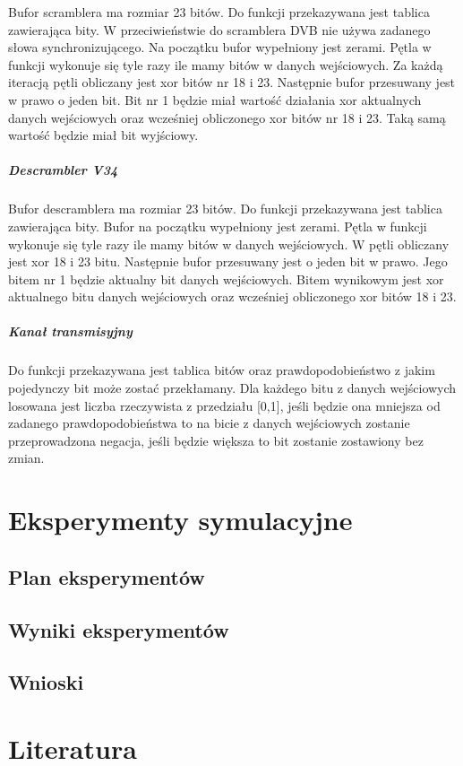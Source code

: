 \documentclass[polish, 11pt]{article}
\begin{document}
    	Bufor scramblera ma rozmiar 23 bitów. Do funkcji przekazywana jest tablica zawierająca bity. W przeciwieństwie do scramblera DVB nie używa zadanego słowa synchronizującego. Na początku bufor wypełniony jest zerami. Pętla w funkcji wykonuje się tyle razy ile mamy bitów w danych wejściowych.  Za każdą iteracją pętli obliczany jest xor bitów nr 18 i 23. Następnie bufor przesuwany jest w prawo o jeden bit. Bit nr 1 będzie miał wartość działania xor aktualnych danych wejściowych oraz wcześniej obliczonego xor bitów nr 18 i 23. Taką samą wartość będzie miał bit wyjściowy.
    	\subparagraph{Descrambler V34\\}
    	Bufor descramblera ma rozmiar 23 bitów. Do funkcji przekazywana jest tablica zawierająca bity. Bufor na początku wypełniony jest zerami. Pętla w funkcji wykonuje się tyle razy ile mamy bitów w danych wejściowych. W pętli obliczany jest xor 18 i 23 bitu. Następnie bufor przesuwany jest o jeden bit w prawo. Jego bitem nr 1 będzie aktualny bit danych wejściowych. Bitem wynikowym jest xor aktualnego bitu danych wejściowych oraz wcześniej obliczonego xor bitów 18 i 23.
    	\subparagraph{Kanał transmisyjny\\}
    	Do funkcji przekazywana jest tablica bitów oraz prawdopodobieństwo z jakim pojedynczy bit może zostać przekłamany. Dla każdego bitu z danych wejściowych losowana jest liczba rzeczywista z przedziału [0,1], jeśli będzie ona mniejsza od zadanego prawdopodobieństwa to na bicie z danych wejściowych zostanie przeprowadzona negacja, jeśli będzie większa to bit zostanie zostawiony bez zmian.
\section{Eksperymenty symulacyjne}
    \subsection{Plan eksperymentów}

    \subsection{Wyniki eksperymentów}

    \subsection{Wnioski}

\section{Literatura}
\end{document}
